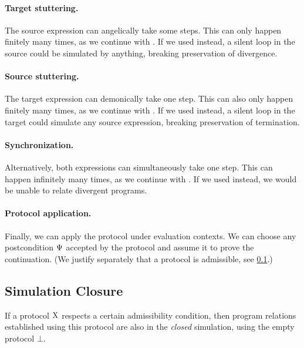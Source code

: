 \paragraph{ Target stuttering.}
The source expression can angelically take some steps.
This can only happen finitely many times, as we continue with \iSimLfp.
If we used \iSimGfp instead, a silent loop in the source could be simulated by anything, breaking preservation of divergence.

\paragraph{ Source stuttering.}
The target expression can demonically take one step.
This can also only happen finitely many times, as we continue with \iSimLfp.
If we used \iSimGfp instead, a silent loop in the target could simulate any source expression, breaking preservation of termination.

\paragraph{ Synchronization.}
Alternatively, both expressions can simultaneously take one step.
This can happen infinitely many times, as we continue with \iSimGfp.
If we used \iSimLfp instead, we would be unable to relate divergent programs.

\paragraph{ Protocol application.}
Finally, we can apply the protocol under evaluation contexts.
We can choose any postcondition $\Psi$ accepted by the protocol and assume it to prove the continuation.
(We justify separately that a protocol is admissible, see \cref{subsec:closure}.)

\subsection{Simulation Closure}\label{subsec:closure}

If a protocol $\mathrm{X}$ respects a certain admissibility condition, then program relations established using this protocol are also in the \emph{closed} simulation, using the empty protocol $\bot$.

